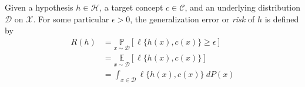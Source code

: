 \documentclass[
  journal=largetwo,
  year=2025,
  volume=37,
]{cup-journal}
\begin{document}
\begin{definition}
    Given a hypothesis $h\in\mathcal{H}$, a target concept $c\in\mathcal{C}$, and an underlying distribution $\mathcal{D}$ on $\mathcal{X}$. For some particular $\epsilon>0$, the generalization error or \textit{risk} of $h$ is defined by
    \begin{equation}
        \begin{split}
          R(h) 
          &= \underset{x\sim\mathcal{D}}{\mathbb{P}} [\ell\{h(x),c(x)\}\geq \epsilon]\\
          &= \underset{x\sim\mathcal{D}}{\mathbb{E}}[\ell\{h(x),c(x)\}]\\ 
          &= \int_{x\in \mathcal{D}} \ell\{h(x),c(x)\} \: dP(x)
        \end{split}
    \end{equation}
\end{definition}
\end{document}
